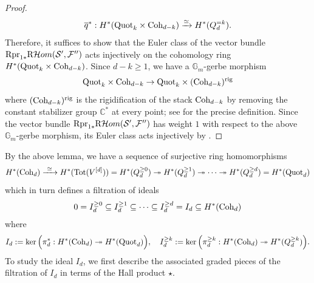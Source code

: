 \documentclass[10pt]{amsart}
\newcommand{\Tot}{\mathrm{Tot}}
\newcommand{\BC}{\mathbb{C}}
\newcommand{\R}{\textnormal{R}}
\newcommand{\CS}{\mathcal{S}}
\newcommand{\CF}{\mathcal{F}}
\newcommand{\Quot}{\textnormal{Quot}}
\newcommand{\Coh}{\textnormal{Coh}}
\newcommand{\pr}{\textnormal{pr}}
\newcommand{\+}{{}^+}
\theoremstyle{definition}
\theoremstyle {definition}
\theoremstyle {definition}
\begin{document}
\begin{proof}
$$\overline{q}^*:H^*(\Quot_k\times\Coh_{d-k})\xrightarrow{\simeq}H^*(Q^{=k}_d). 
$$
Therefore, it suffices to show that the Euler class of the vector bundle $\R\pr_{1*}\R\mathcal{H}om(\CS',\CF'')$ acts injectively on the cohomology ring $H^*(\Quot_k\times \Coh_{d-k})$. Since $d-k\geq 1$, we have a $\mathbb{G}_m$-gerbe morphism
$$\Quot_k\times \Coh_{d-k}\rightarrow \Quot_k\times (\Coh_{d-k})^{\textnormal{rig}}
$$
where $(\Coh_{d-k})^{\textnormal{rig}}$ is the rigidification of the stack $\Coh_{d-k}$ by removing the constant stabilizer group $\BC^*$ at every point; see \cite{AOV} for the precise definition. Since the vector bundle $\R\pr_{1*}\R\mathcal{H}om(\CS',\CF'')$ has weight $1$ with respect to the above $\mathbb{G}_m$-gerbe morphism, its Euler class acts injectively by \cite[Lem. 5.13]{Heinloth_lecturenote}.

\end{proof}

By the above lemma, we have a sequence of surjective ring homomorphisms
$$H^*(\Coh_d)\xrightarrow{\ \simeq\ } H^*(\Tot(V^{[d]}))=H^*(Q^{\geq 0}_d)\twoheadrightarrow H^*(Q^{\geq 1}_d)\twoheadrightarrow\cdots \twoheadrightarrow H^*(Q^{\geq d}_d)=H^*(\Quot_{d}) 
$$
which in turn defines a filtration of ideals
\begin{equation}\label{eq: filtration of the ideal}
    0=I_d^{\geq 0}\subseteq I_d^{\geq 1}\subseteq\cdots\subseteq I_d^{\geq d}=I_d \subseteq H^*(\Coh_{d})
\end{equation}
where $$I_d:= \ker\Big(\pi_d^*:H^*(\Coh_d)\twoheadrightarrow H^*(\Quot_d)\Big),\quad I^{\geq k}_d:=\ker\Big(\pi^{\geq k}_d: H^*(\Coh_d)\twoheadrightarrow H^*(Q^{\geq k}_d)\Big).$$
To study the ideal $I_d$, we first describe the associated graded pieces of the filtration of $I_d$ in terms of the Hall product $\star$. 
\end{document}
